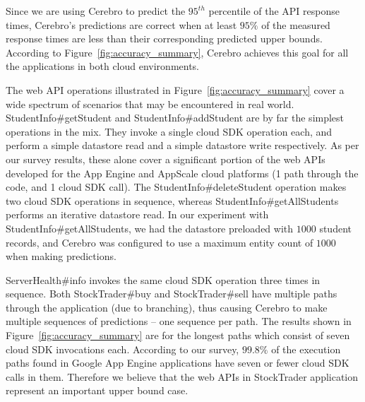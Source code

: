 Since we are using Cerebro to predict the $95^{th}$ percentile of the API
response times, Cerebro's predictions are correct when at 
least $95\%$ of the measured response times are
less than their corresponding predicted upper bounds. According to
Figure~\ref{fig:accuracy_summary}, Cerebro achieves this goal for all the
applications in both cloud environments. 

The web API operations illustrated in Figure~\ref{fig:accuracy_summary} cover
a wide spectrum of scenarios that may be encountered in real world.
StudentInfo\#getStudent and StudentInfo\#addStudent are by far the simplest
operations in the mix. They invoke a single cloud SDK operation each, and
perform a simple datastore read and a simple datastore write respectively. As
per our survey results, these alone cover a significant portion of the web
APIs developed for the App Engine and AppScale cloud platforms (1 path through
the code, and 1 cloud SDK call).  The StudentInfo\#deleteStudent operation
makes two cloud SDK operations in sequence, whereas
StudentInfo\#getAllStudents performs an iterative datastore read.  In our
experiment with StudentInfo\#getAllStudents, we had the datastore preloaded
with $1000$ student records, and Cerebro was configured to use a maximum entity
count of $1000$ when making predictions.

ServerHealth\#info invokes the same cloud SDK operation three times in
sequence. Both StockTrader\#buy and StockTrader\#sell have multiple paths
through the application 
(due to branching), thus causing Cerebro to make multiple
sequences of predictions -- one sequence per path. The results shown in
Figure~\ref{fig:accuracy_summary} are for the longest paths which consist of
seven cloud SDK invocations each. According to our survey, $99.8\%$ of the
execution paths found in Google App Engine applications have seven or 
fewer cloud SDK
calls in them. Therefore we believe that the web APIs in StockTrader
application represent an important upper bound case. 

